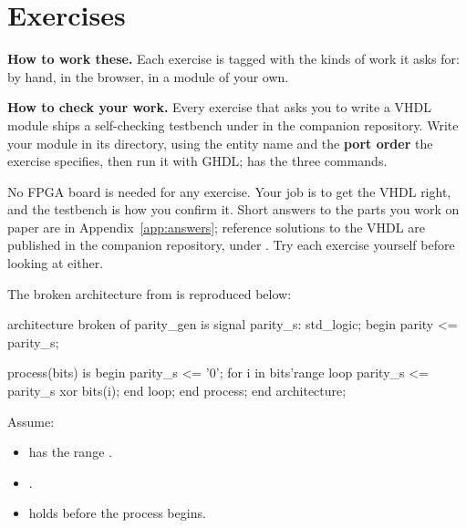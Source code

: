 
\section{Exercises}
\label{c5:sec:exercises}

\begin{aside}
\textbf{How to work these.} Each exercise is tagged with the kinds of work it asks for:
 by hand,  in the browser,  in a module of your own.

\textbf{How to check your work.} Every exercise that asks you to write a VHDL module ships a
self-checking testbench under  in the companion repository. Write your
module in its  directory, using the entity name and the \textbf{port
order} the exercise specifies, then run it with GHDL;  has the three commands.

No FPGA board is needed for any exercise. Your job is to get the VHDL right, and the testbench is
how you confirm it. Short answers to the parts you work on paper are in
Appendix~\ref{app:answers}; reference solutions to the VHDL are published in the companion
repository, under . Try each exercise yourself before looking at
either.
\end{aside}

\label{c5:set:1}

\label{c5:ex:1}
The broken  architecture from  is reproduced below:

\begin{vhdlcode}
architecture broken of parity_gen is
signal parity_s: std_logic;
begin
    parity <= parity_s;

    process(bits) is
    begin
        parity_s <= '0';
        for i in bits'range loop
            parity_s <= parity_s xor bits(i);
        end loop;
    end process;
end architecture;
\end{vhdlcode}

\noindent Assume:
\begin{itemize}
  \item {} has the range .
  \item {}.
  \item {} holds  before the process begins.
\end{itemize}

